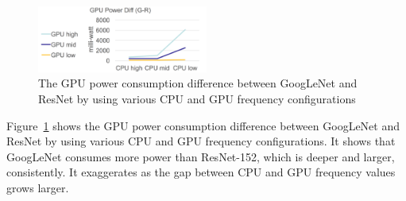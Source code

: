 \begin{figure}[h]
    \centering
    \includegraphics[width=0.5\textwidth]{gpupowerdiff.png}
    \caption{The GPU power consumption difference between GoogLeNet and ResNet by using various CPU and GPU frequency configurations}\label{fig:gpupowerdiff}
\end{figure}


Figure~\ref{fig:gpupowerdiff} shows the GPU power consumption difference between GoogLeNet and ResNet by using various CPU and GPU frequency configurations. It shows that GoogLeNet consumes more power than ResNet-152, which is deeper and larger, consistently. It exaggerates as the gap between CPU and GPU frequency values grows larger. 
